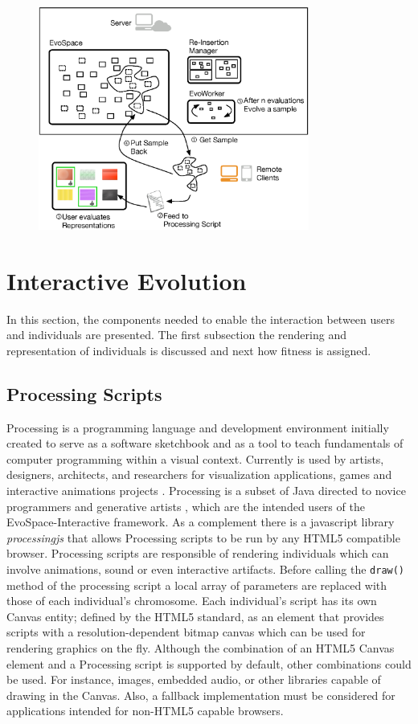 \documentclass{sig-alternate}
\begin{document}
\begin{figure}[!t]
    \centering
        \includegraphics[width=3.5in]{evospaceInteractive.eps}
    \caption{}
    \label{fig:evoInteractive}
\end{figure}


\section{Interactive Evolution}
\label{sec:ineractive}
In this section, the components needed to enable the interaction between users and individuals are presented. The first subsection the rendering and representation of individuals is discussed and next how fitness is assigned.

\subsection{Processing Scripts}
Processing is a programming language and development environment initially created to serve as a software sketchbook and as a tool to teach fundamentals
of computer programming within a visual context.
Currently is used by artists, designers, architects, and researchers for visualization applications, games and interactive animations projects \cite{Reas:2007wp}.
Processing is a subset of Java directed to novice programmers and generative artists \cite{Pearson:2011ti}, which are the intended users of the EvoSpace-Interactive framework.
As a complement there is a javascript library \emph{processingjs} that allows Processing scripts to be run by any HTML5 compatible browser.
Processing scripts are responsible of rendering individuals which can involve animations, sound or even interactive artifacts.
Before calling the \texttt{draw()} method of the processing script a local array of parameters are replaced with those of each individual's chromosome.
Each individual's script has its own Canvas entity; defined by the HTML5 standard, as an element that provides scripts with a resolution-dependent bitmap canvas which can be used for rendering graphics on the fly.
Although the combination of an HTML5 Canvas element and a Processing script is supported by default, other combinations could be used.
For instance, images, embedded audio, or other libraries capable of drawing in the Canvas.
Also, a fallback implementation must be considered for applications intended for non-HTML5 capable browsers.
\end{document}
